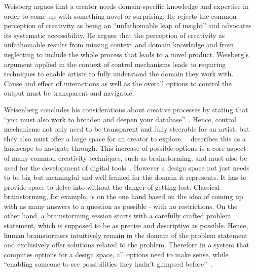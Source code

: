 Weisberg argues that a creator needs domain-specific knowledge and expertise in order to come up with something novel or surprising. 
He rejects the common perception of creativity as being an ``unfathomable leap of insight'' and advocates its systematic accessibility. He argues that the perception of creativity as unfathomable results from missing context and domain knowledge and from neglecting to include the whole process that leads to a novel product. Weisberg's argument applied in the context of control mechanisms leads to requiring techniques to enable artists to fully understand the domain they work with. Cause and effect of interactions as well as the overall options to control the output must be transparent and navigable.

Weisenberg concludes his considerations about creative processes by stating that ``you must also work to broaden and deepen your database''~\cite{markman_2009_tis}. Hence, control mechanisms not only need to be transparent and fully steerable for an artist, but they also must offer a large space for an creator to explore. \citeauthor*{boden_2010_cat}~\cite{boden_2010_cat} describes this as a landscape to navigate through. This increase of possible options is a core aspect of many common creativity techniques, such as brainstorming, and must also be used for the development of digital tools~\cite{terry_2004_vea}.
However a design space not just needs to be big but meaningful and well framed for the domain it represents. It has to provide space to delve into without the danger of getting lost. Classical brainstorming, for example, is on the one hand based on the idea of coming up with as many answers to a question as possible - with no restrictions. On the other hand, a brainstorming session starts with a carefully crafted problem statement, which is supposed to be as precise and descriptive as possible. Hence, human brainstormers intuitively remain in the domain of the problem statement and exclusively offer solutions related to the problem. Therefore in a system that computes options for a design space, all options need to make sense, while ``enabling someone to see possibilities they hadn't glimpsed before''~\cite{boden_2010_cat}. 

